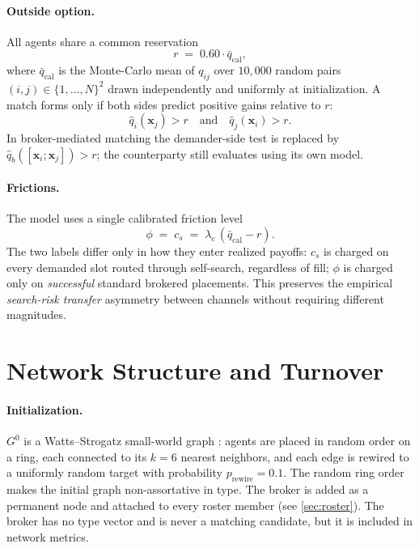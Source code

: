 \documentclass[11pt]{article}
\providecommand{\cref}[1]{\ref{#1}}
\newcommand{\x}{\mathbf{x}}
\newcommand{\qhat}{\hat{q}}
\newcommand{\Ntot}{N}
\begin{document}
\paragraph{Outside option.} All agents share a common reservation
\begin{equation}
r \;=\; 0.60\cdot\bar q_{\text{cal}},
\label{eq:outside}
\end{equation}
where $\bar q_{\text{cal}}$ is the Monte-Carlo mean of $q_{ij}$ over $10{,}000$ random pairs $(i,j)\in\{1,\ldots,\Ntot\}^2$ drawn independently and uniformly at initialization. A match forms only if both sides predict positive gains relative to $r$:
\begin{equation}
\qhat_i(\x_j) > r\quad\text{and}\quad \qhat_j(\x_i) > r.
\label{eq:participation}
\end{equation}
In broker-mediated matching the demander-side test is replaced by $\qhat_b([\x_i;\x_j])>r$; the counterparty still evaluates using its own model.

\paragraph{Frictions.} The model uses a single calibrated friction level
\begin{equation}
\phi \;=\; c_s \;=\; \lambda_c\,(\bar q_{\text{cal}} - r).
\label{eq:frictions}
\end{equation}
The two labels differ only in how they enter realized payoffs: $c_s$ is charged on every demanded slot routed through self-search, regardless of fill; $\phi$ is charged only on \emph{successful} standard brokered placements. This preserves the empirical \emph{search-risk transfer} asymmetry between channels without requiring different magnitudes.

\section{Network Structure and Turnover}\label{sec:network}

\paragraph{Initialization.} $G^0$ is a Watts--Strogatz small-world graph \cite{wattsstrogatz1998}: agents are placed in random order on a ring, each connected to its $k=6$ nearest neighbors, and each edge is rewired to a uniformly random target with probability $p_{\text{rewire}}=0.1$. The random ring order makes the initial graph non-assortative in type. The broker is added as a permanent node and attached to every roster member (see \cref{sec:roster}). The broker has no type vector and is never a matching candidate, but it is included in network metrics.
\end{document}
